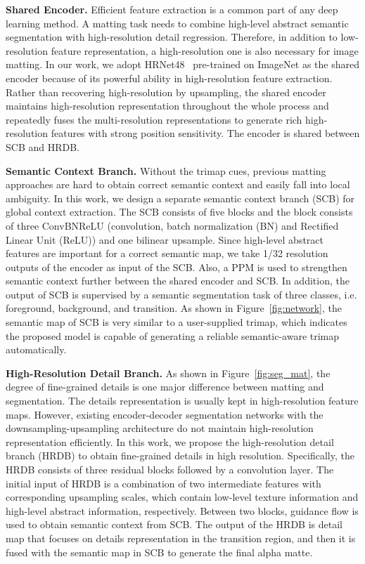 \documentclass[10pt,twocolumn,letterpaper]{article}
\begin{document}
\textbf{Shared Encoder.}
Efficient feature extraction is a common part of any deep learning method. A matting task needs to combine high-level abstract semantic segmentation with high-resolution detail regression. Therefore, in addition to low-resolution feature representation, a high-resolution one is also necessary for image matting. In our work, we adopt HRNet48~\cite{wang2020deep} pre-trained on ImageNet as the shared encoder because of its powerful ability in high-resolution feature extraction. Rather than recovering high-resolution by upsampling, the shared encoder maintains high-resolution representation throughout the whole process and repeatedly fuses the multi-resolution representations to generate rich high-resolution features with strong position sensitivity. The encoder is shared between SCB and HRDB. 

\textbf{Semantic Context Branch.}
Without the trimap cues, previous matting approaches are hard to obtain correct semantic context and easily fall into local ambiguity. In this work, we design a separate semantic context branch (SCB) for global context extraction. The SCB consists of five blocks and the block consists of three ConvBNReLU (convolution, batch normalization (BN) and Rectified Linear Unit (ReLU)) and one bilinear upsample. Since high-level abstract features are important for a correct semantic map, we take 1/32 resolution outputs of the encoder as input of the SCB. Also, a PPM is used to strengthen semantic context further between the shared encoder and SCB. In addition, the output of SCB is supervised by a semantic segmentation task of three classes, i.e. foreground, background, and transition. As shown in Figure~\ref{fig:network}, the semantic map of SCB is very similar to a user-supplied trimap, which indicates the proposed model is capable of generating a reliable semantic-aware trimap automatically.

\textbf{High-Resolution Detail Branch.}
As shown in Figure~\ref{fig:seg_mat}, the degree of fine-grained details is one major difference between matting and segmentation. The details representation is usually kept in high-resolution feature maps. However, existing encoder-decoder segmentation networks with the downsampling-upsampling architecture do not maintain high-resolution representation efficiently. In this work, we propose the high-resolution detail branch (HRDB) to obtain fine-grained details in high resolution. Specifically, the HRDB consists of three residual blocks followed by a convolution layer. The initial input of HRDB is a combination of two intermediate features with corresponding upsampling scales, which contain low-level texture information and high-level abstract information, respectively. Between two blocks, guidance flow is used to obtain semantic context from SCB. The output of the HRDB is detail map that focuses on details representation in the transition region, and then it is fused with the semantic map in SCB to generate the final alpha matte. 
\end{document}
